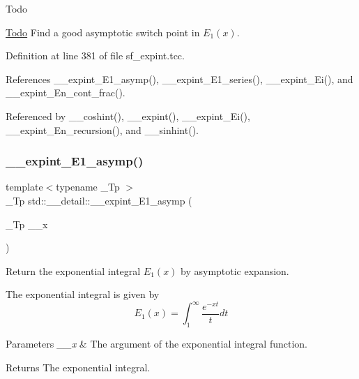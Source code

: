 \begin{DoxyRefDesc}{Todo}
\item[\hyperlink{todo__todo000006}{Todo}]Find a good asymptotic switch point in $ E_1(x) $. \end{DoxyRefDesc}


Definition at line 381 of file sf\+\_\+expint.\+tcc.



References \+\_\+\+\_\+expint\+\_\+\+E1\+\_\+asymp(), \+\_\+\+\_\+expint\+\_\+\+E1\+\_\+series(), \+\_\+\+\_\+expint\+\_\+\+Ei(), and \+\_\+\+\_\+expint\+\_\+\+En\+\_\+cont\+\_\+frac().



Referenced by \+\_\+\+\_\+coshint(), \+\_\+\+\_\+expint(), \+\_\+\+\_\+expint\+\_\+\+Ei(), \+\_\+\+\_\+expint\+\_\+\+En\+\_\+recursion(), and \+\_\+\+\_\+sinhint().

\mbox{\label{namespacestd_1_1____detail_abd02a300cd209be618a6e054a706c012}} 
\subsubsection{\texorpdfstring{\+\_\+\+\_\+expint\+\_\+\+E1\+\_\+asymp()}{\_\_expint\_E1\_asymp()}}
{\footnotesize\ttfamily template$<$typename \+\_\+\+Tp $>$ \\
\+\_\+\+Tp std\+::\+\_\+\+\_\+detail\+::\+\_\+\+\_\+expint\+\_\+\+E1\+\_\+asymp (\begin{DoxyParamCaption}\item[{\+\_\+\+Tp}]{\+\_\+\+\_\+x }\end{DoxyParamCaption})}



Return the exponential integral $ E_1(x) $ by asymptotic expansion. 

The exponential integral is given by \[ E_1(x) = \int_{1}^\infty \frac{e^{-xt}}{t} dt \]


\begin{DoxyParams}{Parameters}
{\em \+\_\+\+\_\+x} & The argument of the exponential integral function. \\
\hline
\end{DoxyParams}
\begin{DoxyReturn}{Returns}
The exponential integral. 
\end{DoxyReturn}


